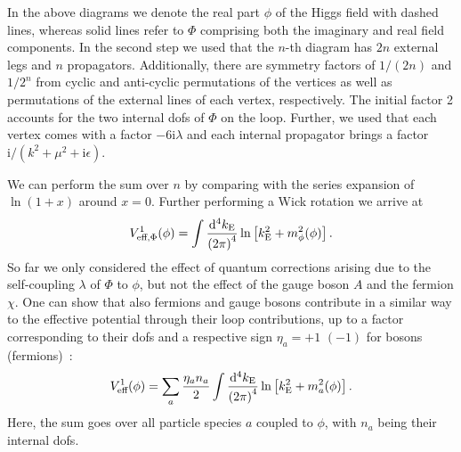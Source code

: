 In the above diagrams we denote the real part $\phi$ of the Higgs field with dashed lines, whereas solid lines refer to $\Phi$ comprising both the imaginary and real field components. In the second step we used that the $n$-th diagram has $2n$ external legs and $n$ propagators. Additionally, there are symmetry factors of $1/(2n)$ and $1/2^n$ from cyclic and anti-cyclic permutations of the vertices as well as permutations of the external lines of each vertex, respectively. The initial factor 2 accounts for the two internal \acp{dof} of $\Phi$ on the loop. Further, we used that each vertex comes with a factor $-6\mathrm{i}\lambda$ and each internal propagator brings a factor $\mathrm{i} / (k^2 + \mu^2 + \mathrm{i} \epsilon)$.

We can perform the sum over $n$ by comparing with the series expansion of $\ln(1+x)$ around $x=0$. Further performing a Wick rotation we arrive at
\begin{align}
	V_{\text{eff}, \Phi}^1(\phi) = \int \frac{\mathop{}\!\mathrm{d}^4 k_\text{E}}{\left( 2  \pi \right)^4} \ln \left[ k_{\text{E}}^2 + m^2_\phi(\phi) \right] .
\end{align}
So far we only considered the effect of quantum corrections arising due to the self-coupling $\lambda$ of $\Phi$ to $\phi$, but not the effect of the gauge boson $A$ and the fermion $\chi$. One can show that also fermions and  gauge bosons contribute in a similar way to the effective potential through their loop contributions, up to a factor corresponding to their \acp{dof} and a respective sign $\eta_a = +1$ $(-1)$ for bosons (fermions)~\cite{Quiros:1999jp}:
\begin{align}
	V_\text{eff}^1(\phi) = \sum_a \frac{\eta_a n_a}{2} \int \frac{\mathop{}\!\mathrm{d}^4 k_\text{E}}{\left( 2  \pi \right)^4} \ln \left[ k_\text{E}^2 + m^2_a(\phi) \right]  .
\end{align}
Here, the sum goes over all particle species $a$ coupled to $\phi$, with $n_a$ being their internal \acp{dof}.


